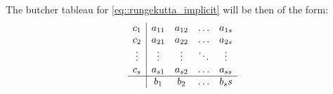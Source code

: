 The butcher tableau for \eqref{eq::rungekutta_implicit} will be then of the form:
\begin{equation}
	\begin{array}
	{c|cccc}
	c_1    & a_{11} & a_{12} & \ldots & a_{1s} \\
	c_2    & a_{21} & a_{22} & \ldots & a_{2s} \\
	\vdots & \vdots & \vdots & \ddots & \vdots \\
	c_s    & a_{s1} & a_{s2} & \ldots & a_{ss} \\ \hline
	       & b_1    & b_2    & \ldots & b_ss
	\end{array}
\end{equation}


